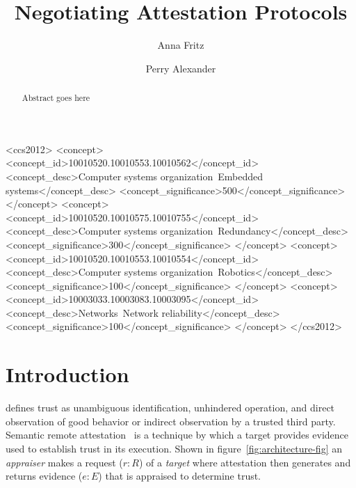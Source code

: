 \documentclass[sigconf,authordraft]{acmart}
\begin{document}
\title{Negotiating Attestation Protocols}

\author{Anna Fritz}  \author{Perry Alexander}
  

\renewcommand{\shortauthors}{Fritz and Alexander}

\begin{abstract}
  Abstract goes here
\end{abstract}

\begin{CCSXML}
  <ccs2012> <concept>
  <concept_id>10010520.10010553.10010562</concept_id>
  <concept_desc>Computer systems organization~Embedded
  systems</concept_desc>
  <concept_significance>500</concept_significance> </concept>
  <concept> <concept_id>10010520.10010575.10010755</concept_id>
  <concept_desc>Computer systems
  organization~Redundancy</concept_desc>
  <concept_significance>300</concept_significance> </concept>
  <concept> <concept_id>10010520.10010553.10010554</concept_id>
  <concept_desc>Computer systems organization~Robotics</concept_desc>
  <concept_significance>100</concept_significance> </concept>
  <concept> <concept_id>10003033.10003083.10003095</concept_id>
  <concept_desc>Networks~Network reliability</concept_desc>
  <concept_significance>100</concept_significance> </concept>
  </ccs2012>
\end{CCSXML}



\maketitle

\section{Introduction}

\citet{Martin:08:The-ten-page-in} defines trust as unambiguous
identification, unhindered operation, and direct observation of good
behavior or indirect observation by a trusted third party.  Semantic
remote attestation~\cite{Haldar:04:Semantic-Remote} is a technique by
which a target provides evidence used to establish trust in its
execution.  Shown in figure~\ref{fig:architecture-fig} an
\emph{appraiser} makes a request ($r:R$) of a \emph{target} where attestation then generates and returns evidence ($e:E$) that is appraised to
determine trust.
\end{document}
